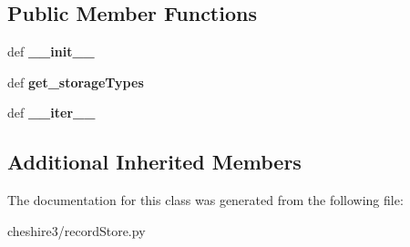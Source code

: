 \subsection*{Public Member Functions}
\begin{DoxyCompactItemize}
\item 
\hypertarget{classcheshire3_1_1record_store_1_1_bdb_record_store_ada64450386698c181a458a12dc5940e3}{def {\bfseries \-\_\-\-\_\-init\-\_\-\-\_\-}}\label{classcheshire3_1_1record_store_1_1_bdb_record_store_ada64450386698c181a458a12dc5940e3}

\item 
\hypertarget{classcheshire3_1_1record_store_1_1_bdb_record_store_a75663b4da8ca6eaa975cc0de5494b43e}{def {\bfseries get\-\_\-storage\-Types}}\label{classcheshire3_1_1record_store_1_1_bdb_record_store_a75663b4da8ca6eaa975cc0de5494b43e}

\item 
\hypertarget{classcheshire3_1_1record_store_1_1_bdb_record_store_a98a6e4137955953f18c499a22b13f81e}{def {\bfseries \-\_\-\-\_\-iter\-\_\-\-\_\-}}\label{classcheshire3_1_1record_store_1_1_bdb_record_store_a98a6e4137955953f18c499a22b13f81e}

\end{DoxyCompactItemize}
\subsection*{Additional Inherited Members}


The documentation for this class was generated from the following file\-:\begin{DoxyCompactItemize}
\item 
cheshire3/record\-Store.\-py\end{DoxyCompactItemize}
